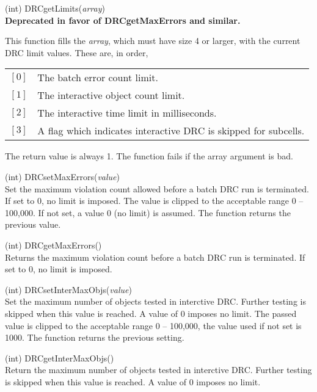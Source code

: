 \begin{description}
\item{(int) \vt DRCgetLimits({\it array\/})}\\
{\bf Deprecated in favor of DRCgetMaxErrors and similar.}

This function fills the {\it array}, which must have size 4 or larger,
with the current DRC limit values.  These are, in order,

\begin{tabular}{ll}
$[0]$ & The batch error count limit.\\
$[1]$ & The interactive object count limit.\\
$[2]$ & The interactive time limit in milliseconds.\\
$[3]$ & A flag which indicates interactive DRC is skipped for subcells.\\
\end{tabular}

The return value is always 1.  The function fails if the array
argument is bad.

\item{(int) \vt DRCsetMaxErrors({\it value\/})}\\
Set the maximum violation count allowed before a batch DRC run is
terminated.  If set to 0, no limit is imposed.  The value is clipped
to the acceptable range 0 -- 100,000.  If not set, a value 0 (no
limit) is assumed.  The function returns the previous value.

\item{(int) \vt DRCgetMaxErrors()}\\
Returns the maximum violation count before a batch DRC run is
terminated.  If set to 0, no limit is imposed.

\item{(int) \vt DRCsetInterMaxObjs({\it value\/})}\\
Set the maximum number of objects tested in interctive DRC.  Further
testing is skipped when this value is reached.  A value of 0 imposes
no limit.  The passed value is clipped to the acceptable range 0 --
100,000, the value used if not set is 1000.  The function returns the
previous setting.

\item{(int) \vt DRCgetInterMaxObjs()}\\
Return the maximum number of objects tested in interctive DRC. 
Further testing is skipped when this value is reached.  A value of 0
imposes no limit.


\end{description}
